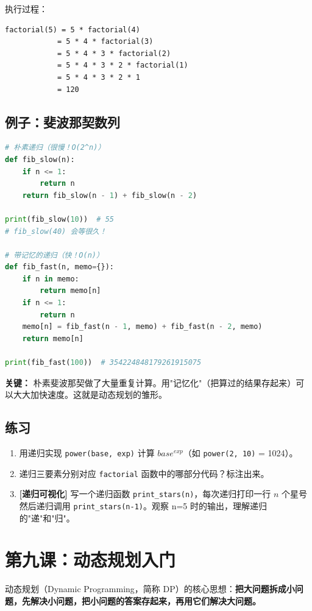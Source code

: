 \documentclass[a4paper,12pt]{ctexart}
\begin{document}
执行过程：
\begin{verbatim}
factorial(5) = 5 * factorial(4)
            = 5 * 4 * factorial(3)
            = 5 * 4 * 3 * factorial(2)
            = 5 * 4 * 3 * 2 * factorial(1)
            = 5 * 4 * 3 * 2 * 1
            = 120
\end{verbatim}

\subsection*{例子：斐波那契数列}

\begin{lstlisting}[language=Python]
# 朴素递归（很慢！O(2^n)）
def fib_slow(n):
    if n <= 1:
        return n
    return fib_slow(n - 1) + fib_slow(n - 2)

print(fib_slow(10))  # 55
# fib_slow(40) 会等很久！

# 带记忆的递归（快！O(n)）
def fib_fast(n, memo={}):
    if n in memo:
        return memo[n]
    if n <= 1:
        return n
    memo[n] = fib_fast(n - 1, memo) + fib_fast(n - 2, memo)
    return memo[n]

print(fib_fast(100))  # 354224848179261915075
\end{lstlisting}

\textbf{关键：} 朴素斐波那契做了大量重复计算。用"记忆化"（把算过的结果存起来）可以大大加快速度。这就是动态规划的雏形。

\subsection*{练习}

\begin{enumerate}
  \item 用递归实现 \texttt{power(base, exp)} 计算 $base^{exp}$（如 \texttt{power(2, 10)} = 1024）。
  \item 递归三要素分别对应 \texttt{factorial} 函数中的哪部分代码？标注出来。
  \item \textbf{[递归可视化]} 写一个递归函数 \texttt{print\_stars(n)}，每次递归打印一行 $n$ 个星号然后递归调用 \texttt{print\_stars(n-1)}。观察 n=5 时的输出，理解递归的"递"和"归"。
\end{enumerate}

\section*{第九课：动态规划入门}

动态规划（Dynamic Programming，简称 DP）的核心思想：\textbf{把大问题拆成小问题，先解决小问题，把小问题的答案存起来，再用它们解决大问题。}
\end{document}

